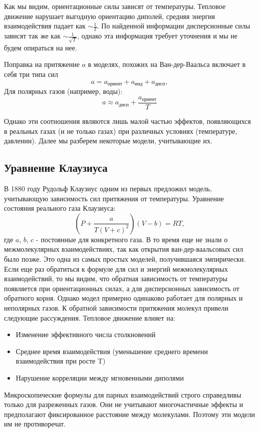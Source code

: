 \documentclass[a4paper]{article}
\numberwithin{equation}{subsection} %
\begin{document}
Как мы видим, ориентационные силы зависят от температуры. Тепловое движение нарушает выгодную ориентацию диполей, средняя энергия взаимодействия падает как $\sim \frac{1}{T}$. По найденной информации дисперсионные силы зависят так же как $\sim \frac{1}{\sqrt{T}}$, однако эта информация требует уточнения и мы не будем опираться на нее.

Поправка на притяжение $a$ в моделях, похожих на Ван-дер-Ваальса включает в себя три типа сил
\begin{equation}
      a = a_{\text{ориент}} + a_{\text{инд}} + a_{\text{дисп}}, 
\end{equation}
Для полярных газов (например, воды):
\begin{equation*}
      a \approx a_{\text{дисп}} + \frac{a_{\text{ориент}}}{T}
\end{equation*}

Однако эти соотношения являются лишь малой частью эффектов, появляющихся в реальных газах (и не только газах) при различных условиях (температуре, давлении). Далее мы разберем некоторые модели, учитывающие их.

\subsection{Уравнение Клаузиуса}
В 1880 году Рудольф Клаузиус одним из первых предложил модель, учитывающую зависимость сил притяжения от температуры. Уравнение состояния реального газа Клаузиуса:
\begin{equation}
      (P + \frac{a}{T(V+c)^2})(V - b) = RT,
\tag{\thesubsection}
\end{equation}
где $a$, $b$, $c$ - постоянные для конкретного газа. 
В то время еще не знали о межмолекулярных взаимодействиях, так как открытия ван-дер-ваальсовых сил было позже. Это одна из самых простых моделей, получившаяся эмпирически. Если еще раз обратиться к формуле для сил и энергий межмолекулярных взаимодействий, то мы видим, что обратная зависимость от температуры появляется при ориентационных силах, а для дисперсионных зависимость от обратного корня. Однако модел примерно одинаково работает для полярных и неполярных газов. К обратной зависимости притяжения молекул привели следующие рассуждения. Тепловое движение влияет на:
\begin{itemize}
\item Изменение эффективного числа столкновений
\item Среднее время взаимодействия (уменьшение среднего времени взаимодействия при росте T)
\item Нарушение корреляции между мгновенными диполями
\end{itemize}
Микроскопические формулы для парных взаимодействий строго справедливы только для разреженных газов. Они не учитывают многочастичные эффекты и предполагают фиксированное расстояние между молекулами. Поэтому эти модели им не противоречат.\\
\end{document}
